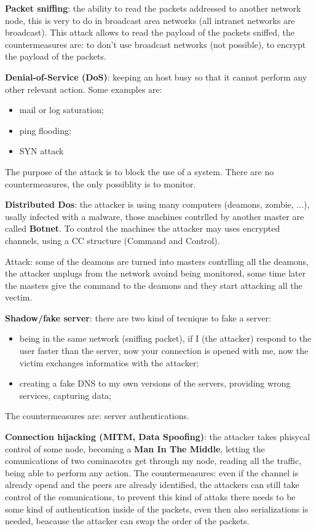 \documentclass[12pt]{article}
\begin{document}
\textbf{Packet sniffing}: the ability to read the packets addressed to another network node, this is very to do in broadcast area networks (all intranet networks are broadcast). This attack allows to read the payload of the packets sniffed, the countermeasures are: to don't use broadcast networks (not possible), to encrypt the payload of the packets.

\textbf{Denial-of-Service (DoS)}: keeping an host busy so that it cannot perform any other relevant action. Some examples are:
\begin{itemize}
    \item mail or log saturation;
    \item ping flooding;
    \item SYN attack
\end{itemize}
The purpose of the attack is to block the use of a system. There are no countermeasures, the only possiblity is to monitor.

\textbf{Distributed Dos}: the attacker is using many computers (deamons, zombie, ...), usally infected with a malware, those machines contrlled by another master are called \textbf{Botnet}. To control the machines the attacker may uses encrypted channels, using a CC structure (Command and Control).

Attack: some of the deamons are turned into masters contrlling all the deamons, the attacker unplugs from the network avoind being monitored, some time later the masters give the command to the deamons and they start attacking all the vectim.

\textbf{Shadow/fake server}: there are two kind of tecnique to fake a server:
\begin{itemize}
    \item being in the same network (sniffing packet), if I (the attacker) respond to the user faster than the server, now your connection is opened with me, now the victim exchanges informatios with the attacker;
    \item creating a fake DNS to my own versions of the servers, providing wrong services, capturing data;
\end{itemize}
The countermeasures are: server authentications.

\textbf{Connection hijacking (MITM, Data Spoofing)}: the attacker takes phisycal control of some node, becoming a \textbf{Man In The Middle}, letting the comunications of two cominacotrs get through my node, reading all the traffic, being able to perform any action. The countermeasures: even if the channel is already opend and the peers are already identified, the attackers can still take control of the comunications, to prevent this kind of attaks there needs to be some kind of authentication inside of the packets, even then also serializations is needed, beacause the attacker can swap the order of the packets.
\end{document}
